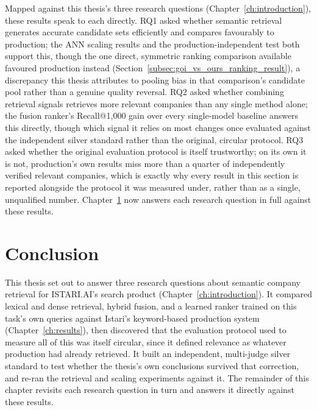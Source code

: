 \documentclass[a4paper,oneside,bibliography=totoc]{scrbook}
\begin{document}
Mapped against this thesis's three research questions (Chapter~\ref{ch:introduction}), these results speak to each directly. RQ1 asked whether semantic retrieval generates accurate candidate sets efficiently and compares favourably to production; the ANN scaling results and the production-independent test both support this, though the one direct, symmetric ranking comparison available favoured production instead (Section~\ref{subsec:goi_vs_ours_ranking_result}), a discrepancy this thesis attributes to pooling bias in that comparison's candidate pool rather than a genuine quality reversal. RQ2 asked whether combining retrieval signals retrieves more relevant companies than any single method alone; the fusion ranker's Recall@1{,}000 gain over every single-model baseline answers this directly, though which signal it relies on most changes once evaluated against the independent silver standard rather than the original, circular protocol. RQ3 asked whether the original evaluation protocol is itself trustworthy; on its own it is not, production's own results miss more than a quarter of independently verified relevant companies, which is exactly why every result in this section is reported alongside the protocol it was measured under, rather than as a single, unqualified number. Chapter~\ref{ch:conclusion} now answers each research question in full against these results.

\chapter{Conclusion}
\label{ch:conclusion}

This thesis set out to answer three research questions about semantic company retrieval for ISTARI.AI's search product (Chapter~\ref{ch:introduction}). It compared lexical and dense retrieval, hybrid fusion, and a learned ranker trained on this task's own queries against Istari's keyword-based production system (Chapter~\ref{ch:results}), then discovered that the evaluation protocol used to measure all of this was itself circular, since it defined relevance as whatever production had already retrieved. It built an independent, multi-judge silver standard to test whether the thesis's own conclusions survived that correction, and re-ran the retrieval and scaling experiments against it. The remainder of this chapter revisits each research question in turn and answers it directly against these results.
\end{document}
